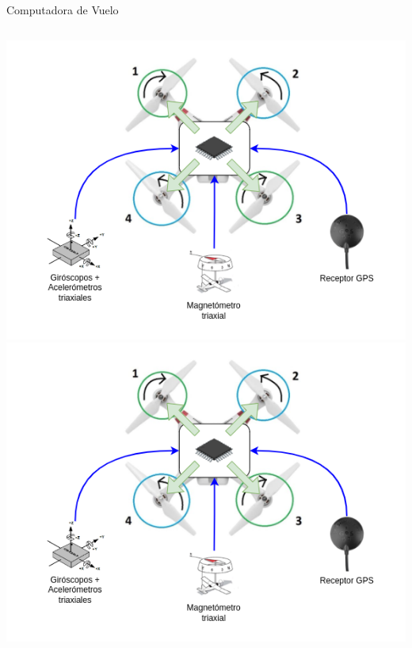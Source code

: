 \begin{frame}{Computadora de Vuelo}
\begin{columns}
\begin{overprint}
				\includegraphics[width=\textwidth]{img/drone_actuadores_sensores.png}
				\onslide<5>\includegraphics[width=\textwidth]{img/drone_actuadores_sensores.png}
			\end{overprint}
	\end{columns}
\end{frame}

